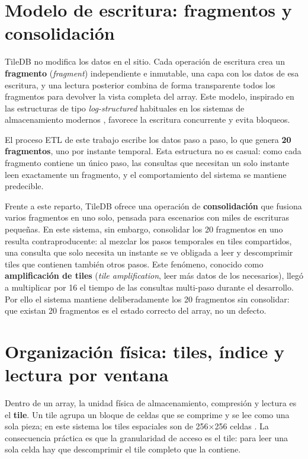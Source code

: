 \section{Modelo de escritura: fragmentos y consolidación}\label{h-fragmentos}

TileDB no modifica los datos en el sitio. Cada operación de escritura crea un \textbf{fragmento} (\textit{fragment}) independiente e inmutable, una capa con los datos de esa escritura, y una lectura posterior combina de forma transparente todos los fragmentos para devolver la vista completa del array. Este modelo, inspirado en las estructuras de tipo \textit{log-structured} habituales en los sistemas de almacenamiento modernos \cite{oneil_lsm}, favorece la escritura concurrente y evita bloqueos.

El proceso ETL de este trabajo escribe los datos paso a paso, lo que genera \textbf{20 fragmentos}, uno por instante temporal. Esta estructura no es casual: como cada fragmento contiene un único paso, las consultas que necesitan un solo instante leen exactamente un fragmento, y el comportamiento del sistema se mantiene predecible.

Frente a este reparto, TileDB ofrece una operación de \textbf{consolidación} que fusiona varios fragmentos en uno solo, pensada para escenarios con miles de escrituras pequeñas. En este sistema, sin embargo, consolidar los 20 fragmentos en uno resulta contraproducente: al mezclar los pasos temporales en tiles compartidos, una consulta que solo necesita un instante se ve obligada a leer y descomprimir tiles que contienen también otros pasos. Este fenómeno, conocido como \textbf{amplificación de tiles} (\textit{tile amplification}, leer más datos de los necesarios), llegó a multiplicar por 16 el tiempo de las consultas multi-paso durante el desarrollo. Por ello el sistema mantiene deliberadamente los 20 fragmentos sin consolidar: que existan 20 fragmentos es el estado correcto del array, no un defecto.

\section{Organización física: tiles, índice y lectura por ventana}\label{h-tiles}

Dentro de un array, la unidad física de almacenamiento, compresión y lectura es el \textbf{tile}. Un tile agrupa un bloque de celdas que se comprime y se lee como una sola pieza; en este sistema los tiles espaciales son de 256$\times$256 celdas \cite{tiledb_datalayout}. La consecuencia práctica es que la granularidad de acceso es el tile: para leer una sola celda hay que descomprimir el tile completo que la contiene.


